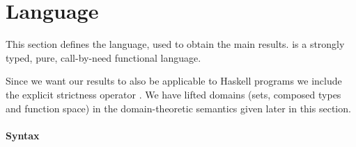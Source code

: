 \section{Language}
\label{sec:language}

This section defines the \lang{} language, used to obtain the main
results.
%
\lang{} is a
 strongly typed,
 pure,
 call-by-need
 functional
 language.


Since we want our results to also be applicable to Haskell programs we
include the explicit strictness operator .
%
We have lifted domains (sets, composed types and function space) in
the domain-theoretic semantics given later in this section.



\paragraph{Syntax}
\label{sec:syntax}
